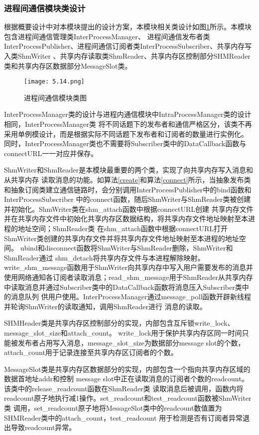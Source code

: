 \subsubsection{进程间通信模块类设计}
根据概要设计中对本模块提出的设计方案，本模块相关类设计如图\ref{interprocess_communication_class}所示。本模块包含进程间通信管理类InterProcessManager、
进程间通信发布者类InterProcessPublisher、进程间通信订阅者类InterProcessSubscriber、共享内存写入类ShmWriter
、共享内存读取类ShmReader、共享内存区控制部分SHMReader类和共享内存区数据部分MessageSlot类。

\begin{figure}[H]
  \centering
  \texttt{[image: 5.14.png]}
  \caption{进程间通信模块类图}
  \label{interprocess_communication_class}
\end{figure}
InterProcessManager类的设计与进程内通信模块中IntraProcessManager类的设计相同，InterProcessManager类
将不同话题下的发布者和通信严格区分，该类不再采用单例模设计，而是根据实际不同话题下发布者和订阅者的数量进行实例化。
同时，InterProcessManager类也不需要将Subscriber类中的DataCallback函数与connectURL一一对应并保存。

ShmWriter和ShmReader是本模块最重要的两个类，实现了向共享内存写入消息和从共享内存
读取消息的功能。如算法\ref{create}和算法\ref{connect}所示，当抽象发布类和抽象订阅类建立通信链路时，会分别调用InterProcessPublisher中的bind函数和InterProcessSubscriber
中的connect函数，随后ShmWriter与ShmReader类被创建并初始化。ShmWriter类在shm\_attach函数中根据connectURL创建
共享内存文件并在共享内存文件中初始化共享内存区数据结构，将共享内存文件地址映射至本进程的地址空间；ShmReader类
在shm\_attach函数中根据connectURL打开ShmWriter类创建的共享内存文件并将共享内存文件地址映射至本进程的地址空间。
ubind和disconnect函数将ShmWriter与ShmReader删除，ShmWriter和ShmReader通过
shm\_detach将共享内存文件与本进程解除映射。write\_shm\_message函数用于ShmWriter向共享内存中写入用户需要发布的消息并
使用网络通知各订阅者读取消息；read\_shm\_message用于ShmReader从共享内存中读取消息并通过Subscriber类中的DataCallback函数将消息压入Subscriber类中的消息队列
供用户使用。InterProcessManager通过message\_poll函数开辟新线程并轮询ShmWriter的读取通知，调用ShmReader进行
消息的读取。

SHMHeader类是共享内存区控制部分的实现，内部包含互斥锁write\_lock、message\_slot\_size和attach\_count。
write\_lock用于保护共享内存区同一时间只能被发布者占用写入消息，message\_slot\_size为数据部分message slot的个数，
attach\_count用于记录连接至共享内存区订阅者的个数。

MessageSlot类是共享内存区数据部分的实现，内部包含一个指向共享内存区域的数据首地址addr和控制
message slot中正在读取消息的订阅者个数的readcount。该类中的release\_readcount函数在ShmReader类
读取消息后被调用，函数内将readcount原子地执行减1操作。set\_readcount和test\_readcount函数被ShmWriter类
调用，set\_readcount原子地将MessageSlot类中的readcount数值置为SHMReader类中的attach\_count，test\_readcount
用于检测是否有订阅者异常退出导致readcount异常。

